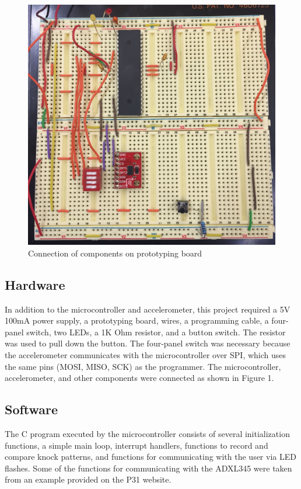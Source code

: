 \documentclass[conference]{./IEEEtran}
\begin{document}
\begin{figure}
\centering
\includegraphics[width=6in]{wires.jpg}
\caption{Connection of components on prototyping board}
\label{wires}
\end{figure}

\subsection{Hardware}
In addition to the microcontroller and accelerometer, this project required a 5V 100mA power supply, a prototyping board, wires, a programming cable, a four-panel switch, two LEDs, a 1K Ohm resistor, and a button switch. The resistor was used to pull down the button. The four-panel switch was necessary because the accelerometer communicates with the microcontroller over SPI, which uses the same pins (MOSI, MISO, SCK) as the programmer. The microcontroller, accelerometer, and other components were connected as shown in Figure 1.  

\subsection{Software}
The C program executed by the microcontroller consists of several initialization functions, a simple main loop, interrupt handlers, functions to record and compare knock patterns, and functions for communicating with the user via LED flashes. Some of the functions for communicating with the ADXL345 were taken from an example provided on the P31 website.
\end{document}
